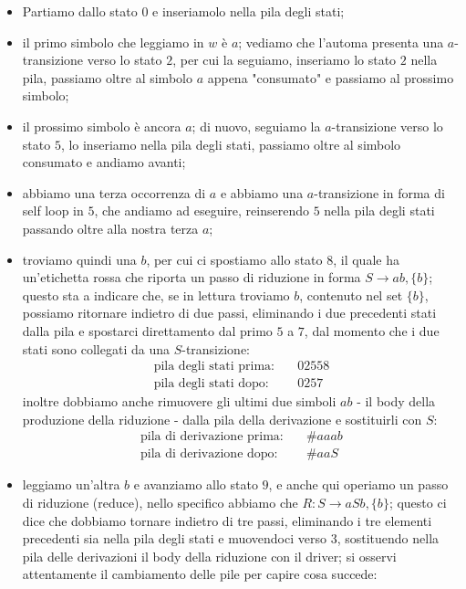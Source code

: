 \documentclass[class=book, crop=false, oneside, 12pt]{standalone}
\begin{document}
\begin{itemize}
    \item Partiamo dallo stato \(0\) e inseriamolo nella pila degli stati;
    \item il primo simbolo che leggiamo in \(w\) è \(a\); vediamo che l'automa presenta una \(a\)-transizione verso lo stato \(2\), per cui la seguiamo, inseriamo lo stato \(2\) nella pila, passiamo oltre al simbolo \(a\) appena "consumato" e passiamo al prossimo simbolo;
    \item il prossimo simbolo è ancora \(a\); di nuovo, seguiamo la \(a\)-transizione verso lo stato \(5\), lo inseriamo nella pila degli stati, passiamo oltre al simbolo consumato e andiamo avanti;
    \item abbiamo una terza occorrenza di \(a\) e abbiamo una \(a\)-transizione in forma di self loop in \(5\), che andiamo ad eseguire, reinserendo \(5\) nella pila degli stati passando oltre alla nostra terza \(a\);
    \item troviamo quindi una \(b\), per cui ci spostiamo allo stato \(8\), il quale ha un'etichetta rossa che riporta un passo di riduzione in forma \(S \to ab, \{b\}\); questo sta a indicare che, se in lettura troviamo \(b\), contenuto nel set \(\{b\}\), possiamo ritornare indietro di due passi, eliminando i due precedenti stati dalla pila e spostarci direttamento dal primo \(5\) a \(7\), dal momento che i due stati sono collegati da una \(S\)-transizione:
    \begin{align*}
        \textrm{pila degli stati prima:} &\quad 02558 \\
        \textrm{pila degli stati dopo:} &\quad 0257 
    \end{align*}
    inoltre dobbiamo anche rimuovere gli ultimi due simboli \(ab\) - il body della produzione della riduzione - dalla pila della derivazione e sostituirli con \(S\):
    \begin{align*}
        \textrm{pila di derivazione prima:} &\quad \#aaab \\
        \textrm{pila di derivazione dopo:} &\quad \#aaS 
    \end{align*}
    \item leggiamo un'altra \(b\) e avanziamo allo stato \(9\), e anche qui operiamo un passo di riduzione (reduce), nello specifico abbiamo che \(R: S \to aSb, \{b\}\); questo ci dice che dobbiamo tornare indietro di tre passi, eliminando i tre elementi precedenti sia nella pila degli stati e muovendoci verso \(3\), sostituendo nella pila delle derivazioni il body della riduzione con il driver; si osservi attentamente il cambiamento delle pile per capire cosa succede:

\end{itemize}
\end{document}
